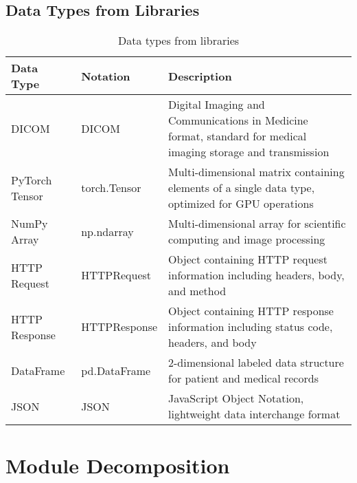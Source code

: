 \documentclass[12pt, titlepage]{article}
\begin{document}
    \subsection{Data Types from Libraries}
\begin{table}[H]
    \centering
    \renewcommand{\arraystretch}{1.2}
    \noindent
    \begin{tabular}{l l p{7.5cm}}
    \toprule
    \textbf{Data Type} & \textbf{Notation} & \textbf{Description} \\
    \midrule
    DICOM & DICOM & Digital Imaging and Communications in Medicine format, standard for medical imaging storage and transmission \\
    PyTorch Tensor & torch.Tensor & Multi-dimensional matrix containing elements of a single data type, optimized for GPU operations \\
    NumPy Array & np.ndarray & Multi-dimensional array for scientific computing and image processing \\
    HTTP Request & HTTPRequest & Object containing HTTP request information including headers, body, and method \\
    HTTP Response & HTTPResponse & Object containing HTTP response information including status code, headers, and body \\
    DataFrame & pd.DataFrame & 2-dimensional labeled data structure for patient and medical records \\
    JSON & JSON & JavaScript Object Notation, lightweight data interchange format \\
    \bottomrule
    \end{tabular}
    \caption{Data types from libraries}
    \end{table}

\newpage
\section{Module Decomposition}
\end{document}
